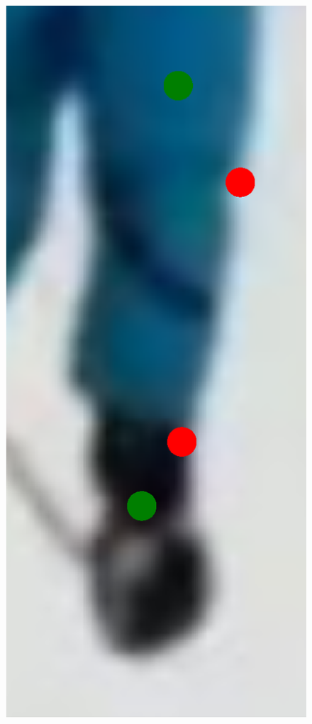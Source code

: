 \begin{figure}[!t]
    \includegraphics[height=\fh]{resources/Fixing/fix_14}
    \hfill

\end{figure}
